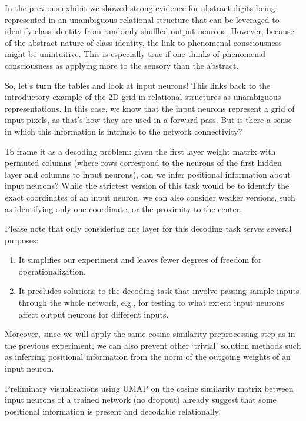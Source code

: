 \documentclass[11pt]{article}
\begin{document}
In the previous exhibit we showed strong evidence for abstract digits being represented in an unambiguous relational structure that can be leveraged to identify class identity from randomly shuffled output neurons. However, because of the abstract nature of class identity, the link to phenomenal consciousness might be unintuitive. This is especially true if one thinks of phenomenal consciousness as applying more to the sensory than the abstract.

So, let's turn the tables and look at input neurons! This links back to the introductory example of the 2D grid in relational structures as unambiguous representations. In this case, we know that the input neurons represent a grid of input pixels, as that's how they are used in a forward pass. But is there a sense in which this information is intrinsic to the network connectivity?

To frame it as a decoding problem: given the first layer weight matrix with permuted columns (where rows correspond to the neurons of the first hidden layer and columns to input neurons), can we infer positional information about input neurons? While the strictest version of this task would be to identify the exact coordinates of an input neuron, we can also consider weaker versions, such as identifying only one coordinate, or the proximity to the center.

Please note that only considering one layer for this decoding task serves several purposes:

\begin{enumerate}
\item It simplifies our experiment and leaves fewer degrees of freedom for operationalization.
\item It precludes solutions to the decoding task that involve passing sample inputs through the whole network, e.g., for testing to what extent input neurons affect output neurons for different inputs.
\end{enumerate}

Moreover, since we will apply the same cosine similarity preprocessing step as in the previous experiment, we can also prevent other `trivial' solution methods such as inferring positional information from the norm of the outgoing weights of an input neuron.

Preliminary visualizations using UMAP on the cosine similarity matrix between input neurons of a trained network (no dropout) already suggest that some positional information is present and decodable relationally.
\end{document}
